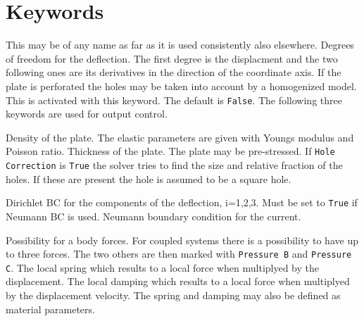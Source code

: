 \section{Keywords}

\sifbegin
{}
\sifbegin
{}
This may be of any name as far as it is used consistently also elsewhere.
Degrees of freedom for the deflection. 
The first degree is the displacment and the two following ones
are its derivatives in the direction of the coordinate axis.
If the plate is perforated the holes may be taken into account by 
a homogenized model. This is activated with this keyword.
The default is \texttt{False}.
The following three keywords are used for output control.
\sifend

\sifbegin
{}
Density of the plate.
The elastic parameters are given with Youngs modulus and Poisson ratio.
Thickness of the plate.
The plate may be pre-stressed.
If \texttt{Hole Correction} is \texttt{True} the solver 
tries to find the size and relative fraction of the holes. 
If these are present the hole is assumed to be a square hole.
\sifend

\sifbegin
{}
Dirichlet BC for the components of the deflection, i=1,2,3.
Must be set to {\tt True} if Neumann BC is used.
Neumann boundary condition for the current.
\sifend

\sifbegin
{}
Possibility for a body forces. For coupled systems there is a 
possibility to have up to three forces. The two others are then
marked with \texttt{Pressure B} and \texttt{Pressure C}.
The local spring which results to a local force when multiplyed
by the displacement.
The local damping which results to a local force when multiplyed
by the displacement velocity. The spring and damping may also be 
defined as material parameters.
\sifend

\sifend

